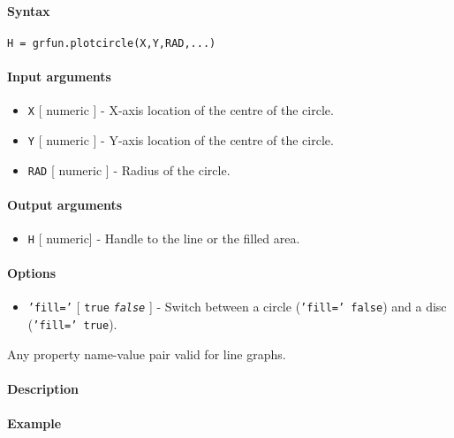 


	\paragraph{Syntax}\label{syntax}

\begin{verbatim}
H = grfun.plotcircle(X,Y,RAD,...)
\end{verbatim}

\paragraph{Input arguments}\label{input-arguments}

\begin{itemize}
\item
  \texttt{X} {[} numeric {]} - X-axis location of the centre of the
  circle.
\item
  \texttt{Y} {[} numeric {]} - Y-axis location of the centre of the
  circle.
\item
  \texttt{RAD} {[} numeric {]} - Radius of the circle.
\end{itemize}

\paragraph{Output arguments}\label{output-arguments}

\begin{itemize}
\itemsep1pt\parskip0pt
\item
  \texttt{H} {[} numeric{]} - Handle to the line or the filled area.
\end{itemize}

\paragraph{Options}\label{options}

\begin{itemize}
\itemsep1pt\parskip0pt
\item
  \texttt{'fill='} {[} \texttt{true} \textbar{} \emph{\texttt{false}}
  {]} - Switch between a circle (\texttt{'fill=' false}) and a disc
  (\texttt{'fill=' true}).
\end{itemize}

Any property name-value pair valid for line graphs.

\paragraph{Description}\label{description}

\paragraph{Example}\label{example}


